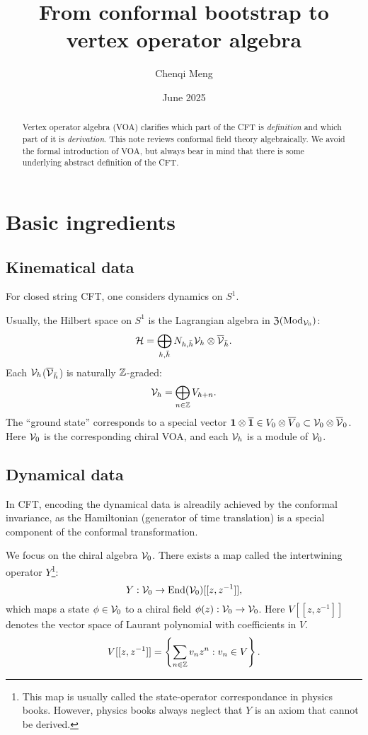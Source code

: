 \documentclass{article}
\title{From conformal bootstrap to vertex operator algebra}
\author{Chenqi Meng}
\date{June 2025}
\begin{document}
\maketitle


\begin{abstract}
    Vertex operator algebra (VOA) clarifies which part of the CFT is \emph{definition} and which part of it is \emph{derivation}.
    This note reviews conformal field theory algebraically. We avoid the formal introduction of VOA, but always bear in mind that there is some underlying abstract definition of the CFT. 
\end{abstract}
\tableofcontents
\section{Basic ingredients}
\subsection{Kinematical data}
For closed string CFT, one considers dynamics on $S^1$. 

Usually, the Hilbert space on $S^1$ is the Lagrangian algebra in $\frak{Z}(\mathrm{Mod}_{{\cal V}_0})$:
\[
{\cal H} = \bigoplus_{h,\bar{h}}N_{h,\bar{h}}{\cal V}_{h}\otimes\overline{{\cal V}}_{\bar{h}}.
\]
Each ${\cal V}_{h}$($\overline{{\cal V}}_{\bar{h}}$) is naturally $\mathbb{Z}$-graded:
\[
{\cal V}_h = \bigoplus_{n\in \mathbb{Z}} V_{h+n}.
\]
The ``ground state'' corresponds to a special vector $\mathbf{1} \otimes\overline{\mathbf{1}} \in V_{0}\otimes \overline{V}_0\subset {\cal V}_{0}\otimes \overline{{\cal V}}_0$.
Here ${\cal V}_0$ is the corresponding chiral VOA, and each ${\cal V}_h$ is a module of ${\cal V}_0$.

\subsection{Dynamical data}
In CFT, encoding the dynamical data is alreadily achieved by the conformal invariance, as the Hamiltonian (generator of time translation) is a special component of the conformal transformation.

We focus on the chiral algebra ${\cal V}_0$. There exists a map called the intertwining operator $Y$\footnote{This map is usually called the state-operator correspondance in physics books. However, physics books always neglect that $Y$ is an axiom that cannot be derived.}:
\[
Y:{\cal V}_0\rightarrow \mathrm{End}({\cal V}_0)[[z,z^{-1}]],
\]
which maps a state $\phi \in {\cal V}_0$ to a chiral field $\phi(z):{\cal V}_0\rightarrow {\cal V}_0$. Here $V[[z,z^{-1}]]$ denotes the vector space of Laurant polynomial with coefficients in $V$.
\[
V[[z,z^{-1}]] = \left\{\sum_{n\in \mathbb{Z}}v_nz^{n}:v_n\in V\right\}.
\]
\end{document}
